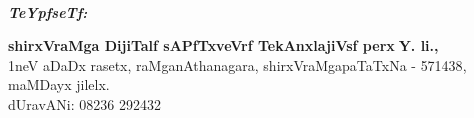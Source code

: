 ~
\thispagestyle{empty}
\vfill


\noindent
{\sl\bfseries TeYpfseTf:}
\medskip

\noindent
{\bf shirxVraMga DijiTalf sAPfTxveVrf TekAnxlajiVsf perx$\;$Y. li.,}\\[3pt]
{\rm 1}neV aDaDx rasetx, raMganAthanagara, shirxVraMgapaTaTxNa - {\rm 571438},\\[3pt]
maMDayx jilelx.\\[4pt]
dUravANi: {\rm 08236 292432}
